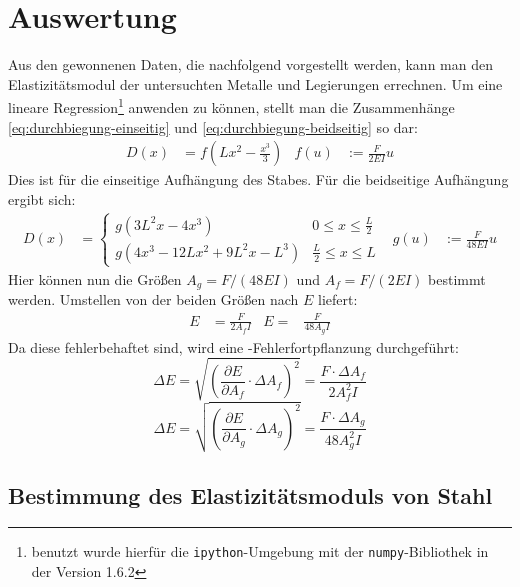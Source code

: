 
\section{Auswertung}

Aus den gewonnenen Daten, die nachfolgend vorgestellt werden, kann man
den Elastizitätsmodul der untersuchten Metalle und Legierungen
errechnen. Um eine lineare Regression\footnote{benutzt wurde hierfür die
  \texttt{ipython}-Umgebung mit der \texttt{numpy}-Bibliothek in der Version
  1.6.2} anwenden zu können, stellt man die Zusammenhänge
\eqref{eq:durchbiegung-einseitig} und \eqref{eq:durchbiegung-beidseitig}
so dar:
%
\begin{align}
  \label{eq:lineare-durchbiegung-einseitig}
  D(x) &= f(Lx^2-\frac{x^3}{3}) & f(u) &:= \frac{F}{2EI}u
\end{align}
Dies ist für die einseitige Aufhängung des Stabes. Für die beidseitige
Aufhängung ergibt sich:
\begin{align}
  \label{eq:lineare-durchbiegung-beidseitig}
  D(x) &= \begin{cases}
    g(3L^2x-4x^3) & 0\le x\le \frac{L}{2}\\
    g(4x^3-12Lx^2 + 9L^2x - L^3) & \frac{L}{2}\le x\le L
  \end{cases}
  & g(u) &:= \frac{F}{48EI}u
\end{align}
%
Hier können nun die Größen $A_g = F/(48EI)$ und $A_f = F/(2EI)$ bestimmt
werden. Umstellen von der beiden Größen nach $E$ liefert:
\begin{align}
  E &= \frac{F}{2A_fI} & E =& \frac{F}{48A_gI}
\end{align}
Da diese fehlerbehaftet sind, wird eine -Fehlerfortpflanzung
durchgeführt:
%
\begin{equation}
  \label{eq:gaussfehler-f}
  \Delta E = \sqrt{\left(\frac{\partial E}{\partial A_f}\cdot\Delta A_f\right)^2}
  = \frac{F\cdot\Delta A_f}{2A_f^2I}
\end{equation}
%
\begin{equation}
  \label{eq:gaussfehler-g}
  \Delta E = \sqrt{\left(\frac{\partial E}{\partial A_g}\cdot\Delta
      A_g\right)^2}
  = \frac{F\cdot\Delta A_g}{48A^2_gI}
\end{equation}

\subsection{Bestimmung des Elastizitätsmoduls von Stahl}

